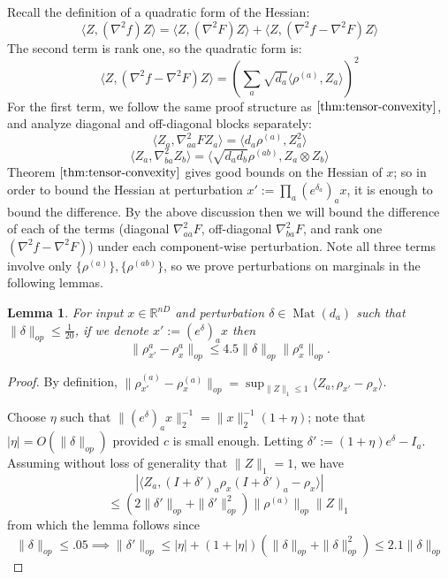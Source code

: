 \documentclass{article}
\newtheorem{lemma}[theorem]{Lemma}
\newcommand{\R}{{\mathbb{R}}}
\newcommand{\mat}{\operatorname{Mat}}
\newcommand\samp{x}
\begin{document}
Recall the definition of a quadratic form of the Hessian:
\[ \langle Z, (\nabla^{2} f) Z \rangle = \langle Z, (\nabla^{2} F) Z \rangle + \langle Z, (\nabla^{2} f - \nabla^{2} F) Z \rangle     \]
The second term is rank one, so the quadratic form is:
\[ \langle Z, (\nabla^{2} f - \nabla^{2} F) Z \rangle = \left( \sum_{a} \sqrt{d_{a}} \langle \rho^{(a)}, Z_{a} \rangle   \right)^{2}       \]
For the first term, we follow the same proof structure as $\cref{thm:tensor-convexity}$, and analyze diagonal and off-diagonal blocks separately:
\[ \langle Z_{a}, \nabla^{2}_{aa} F Z_{a} \rangle = \langle d_{a} \rho^{(a)}, Z_{a}^{2} \rangle       \]
\[ \langle Z_{a}, \nabla^{2}_{ba} Z_{b} \rangle = \langle \sqrt{d_{a} d_{b}} \rho^{(ab)}, Z_{a} \otimes Z_{b} \rangle   \]
Theorem $\cref{thm:tensor-convexity}$ gives good bounds on the Hessian of $\samp$; so in order to bound the Hessian at perturbation $\samp' := \prod_{a} (e^{\delta_{a}})_{a} \samp$, it is enough to bound the difference. By the above discussion then we will bound the difference of each of the terms (diagonal $\nabla^{2}_{aa} F$, off-diagonal $\nabla^{2}_{ba} F$, and rank one $(\nabla^{2} f - \nabla^{2} F)$) under each component-wise perturbation. Note all three terms involve only $\{\rho^{(a)}\}, \{\rho^{(ab)}\}$, so we prove perturbations on marginals in the following lemmas.  

\begin{lemma} \label{atoaaRobustness}
For input $\samp \in \R^{nD}$ and perturbation $\delta \in \mat(d_{a})$ such that $\|\delta\|_{op} \leq \frac{1}{20}$, if we denote $\samp' := (e^{\delta})_{a} \samp$ then
\[ \|\rho_{\samp'}^{a} - \rho_{\samp}^{a}\|_{op} \leq 4.5 \|\delta\|_{op} \|\rho_{\samp}^{a}\|_{op}   . \]
\end{lemma}
\begin{proof} By definition, $\|\rho_{\samp'}^{(a)} - \rho_{\samp}^{(a)}\|_{op} = \sup_{\|Z\|_{1} \leq 1} \langle Z_{a}, \rho_{\samp'} - \rho_{\samp} \rangle $. 


Choose $\eta$ such that  $\|(e^{\delta})_{a} \samp\|_{2}^{-1} = \|\samp\|_{2}^{-1} (1 + \eta)$; note that $|\eta| = O(\|\delta\|_{op})$ provided $c$ is small enough. Letting $\delta' := (1+\eta)e^{\delta} - I_{a}$. Assuming without loss of generality that $\|Z\|_{1} = 1$, we have 
\[ | \langle Z_{a}, (I+\delta')_a \rho_{\samp} (I+\delta')_a - \rho_{\samp} \rangle | \]
\[ \leq (2\|\delta'\|_{op} + \|\delta'\|_{op}^{2}) \|\rho^{(a)}\|_{op} \|Z\|_{1}    \]
from which the lemma follows since 
\[ \|\delta\|_{op} \leq .05 \implies \|\delta'\|_{op} \leq |\eta| + (1+|\eta|)(\|\delta\|_{op} + \|\delta\|_{op}^{2}) \leq  2.1 \|\delta\|_{op} \]
\end{proof}
\end{document}
